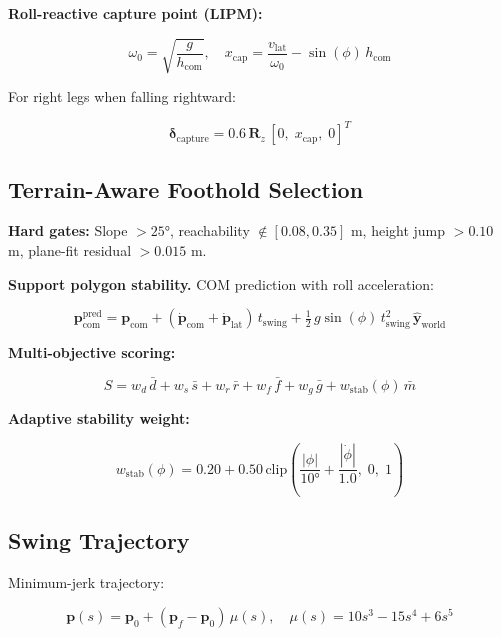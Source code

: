 \documentclass[11pt,a4paper]{article}
\begin{document}
\textbf{Roll-reactive capture point (LIPM):}

\begin{equation}
\omega_0 = \sqrt{\frac{g}{h_{\text{com}}}}, \quad x_{\text{cap}} = \frac{v_{\text{lat}}}{\omega_0} - \sin(\phi)\,h_{\text{com}}
\end{equation}

For right legs when falling rightward:

\begin{equation}
\boldsymbol{\delta}_{\text{capture}} = 0.6\,\mathbf{R}_z\,[0,\; x_{\text{cap}},\; 0]^T
\end{equation}

\subsection{Terrain-Aware Foothold Selection}

\textbf{Hard gates:} Slope $> 25°$, reachability $\notin [0.08, 0.35]$ m, height jump $> 0.10$ m, plane-fit residual $> 0.015$ m.

\textbf{Support polygon stability.} COM prediction with roll acceleration:

\begin{equation}
\mathbf{p}_{\text{com}}^{\text{pred}} = \mathbf{p}_{\text{com}} + (\dot{\mathbf{p}}_{\text{com}} + \dot{\mathbf{p}}_{\text{lat}})\,t_{\text{swing}} + \tfrac{1}{2}\,g\sin(\phi)\,t_{\text{swing}}^2\,\hat{\mathbf{y}}_{\text{world}}
\end{equation}

\textbf{Multi-objective scoring:}

\begin{equation}
S = w_d\,\bar{d} + w_s\,\bar{s} + w_r\,\bar{r} + w_f\,\bar{f} + w_g\,\bar{g} + w_{\text{stab}}(\phi)\,\bar{m}
\end{equation}

\textbf{Adaptive stability weight:}

\begin{equation}
w_{\text{stab}}(\phi) = 0.20 + 0.50\,\text{clip}\!\left(\frac{|\phi|}{10°} + \frac{|\dot{\phi}|}{1.0},\; 0,\; 1\right)
\end{equation}

\subsection{Swing Trajectory}

Minimum-jerk trajectory:

\begin{equation}
\mathbf{p}(s) = \mathbf{p}_0 + (\mathbf{p}_f - \mathbf{p}_0)\,\mu(s), \quad \mu(s) = 10s^3 - 15s^4 + 6s^5
\end{equation}
\end{document}
